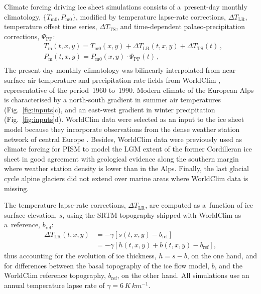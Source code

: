 \documentclass[tc, manuscript]{copernicus}
\begin{document}
    Climate forcing driving ice sheet simulations consists of a~present-day
    monthly climatology, $\{T_{\mathrm{m}0}, P_{\mathrm{m}0}\}$, modified by
    temperature lapse-rate corrections, ${\Delta}T_{\text{LR}}$, temperature
    offset time series, ${\Delta}T_{\text{TS}}$, and time-dependent
    palaeo-precipitation corrections, $\Psi_{\text{PP}}$:
    \begin{align}
      &T_{\mathrm{m}}(t, x, y) = T_{\mathrm{m}0}(x, y) +
                                 {\Delta}T_{\text{LR}}(t, x, y) +
                                 {\Delta}T_{\text{TS}}(t) \,, \\
      &P_{\mathrm{m}}(t, x, y) = P_{\mathrm{m}0}(x, y) \cdot
                                 {\Psi}_{\text{PP}}(t) \,, \\
    \end{align}
    The present-day monthly climatology was bilinearly interpolated from
    near-surface air temperature and precipitation rate fields from
    WorldClim \citep{Hijmans.etal.2005}, representative of the period~1960
    to~1990. Modern climate of the European Alps is characterised by a
    north-south gradient in summer air temperatures (Fig.~\ref{fig:inputs}c),
    and an east-west gradient in winter precipitation (Fig.~\ref{fig:inputs}d).
    WorldClim data
    were selected as an input to the ice sheet model because they incorporate
    observations from the dense weather station network of central Europe
    \citep[Fig.~1]{Hijmans.etal.2005}. Besides, WorldClim data were
    previously used as climate forcing for PISM to model the LGM extent of the
    former Cordilleran ice sheet in good agreement with geological evidence
    along the southern margin \citep{Seguinot.etal.2014} where weather station
    density is lower than in the Alps. Finally, the last glacial cycle alpine
    glaciers did not extend over marine areas where WorldClim data is missing.

    The temperature lapse-rate corrections, ${\Delta}T_{\text{LR}}$, are
    computed as a~function of ice surface elevation, $s$, using the SRTM
    topography shipped with WorldClim as a~reference, $b_{\text{ref}}$:
    \begin{align}
      {\Delta}T_{\text{LR}}(t, x, y) &= -\gamma [s(t, x, y)-b_{\text{ref}}] \\
                                     &= -\gamma [h(t, x, y)+
                                                 b(t, x, y)-b_{\text{ref}}],
    \end{align}
    thus accounting for the evolution of ice thickness, ${h=s-b}$, on the one
    hand, and for differences between the basal topography of the ice flow
    model, $b$, and the WorldClim reference topography, $b_{\text{ref}}$, on
    the other hand. All simulations use an annual temperature lapse rate of
    $\gamma=6\,\unit{K\,km^{-1}}$.
\end{document}
